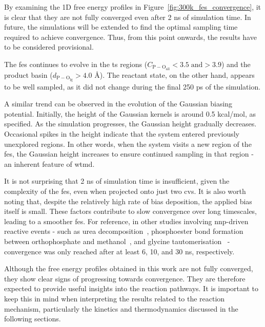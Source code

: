 By examining the 1D free energy profiles in Figure~\ref{fig:300k_fes_convergence}, it is clear that they are not fully converged even after 2 ns of simulation time. In future, the simulations will be extended to find the optimal sampling time required to achieve convergence. Thus, from this point onwards, the results have to be considered provisional.

The \ac{fes} continues to evolve in the \ac{ts} regions ($C_\mathrm{P-O_{\mathrm{all}}}<3.5 \; \mathrm{and} >3.9$) and the product basin ($d_\mathrm{P-O_{\mathrm{lg}}}>4.0$ \AA). The reactant state, on the other hand, appears to be well sampled, as it did not change during the final 250 ps of the simulation.

A similar trend can be observed in the evolution of the Gaussian biasing potential. Initially, the height of the Gaussian kernels is around 0.5 kcal/mol, as specified. As the simulation progresses, the Gaussian height gradually decreases. Occasional spikes in the height indicate that the system entered previously unexplored regions. In other words, when the system visits a new region of the \ac{fes}, the Gaussian height increases to ensure continued sampling in that region - an inherent feature of \ac{wtmd}.

It is not surprising that 2 ns of simulation time is insufficient, given the complexity of the \ac{fes}, even when projected onto just two \acp{cv}. It is also worth noting that, despite the relatively high rate of bias deposition, the applied bias itself is small. These factors contribute to slow convergence over long timescales, leading to a smoother \ac{fes}. For reference, in other studies involving \ac{nnp}-driven reactive events - such as urea decomposition~\citep{yangUsingMetadynamicsBuild2022}, phosphoester bond formation between orthophosphate and methanol~\citep{benayadPrebioticChemicalReactivity2024}, and glycine tautomerisation~\citep{zhangIntramolecularWaterMediated2024} - convergence was only reached after at least 6, 10, and 30 ns, respectively.

Although the free energy profiles obtained in this work are not fully converged, they show clear signs of progressing towards convergence. They are therefore expected to provide useful insights into the reaction pathways. It is important to keep this in mind when interpreting the results related to the reaction mechanism, particularly the kinetics and thermodynamics discussed in the following sections.



